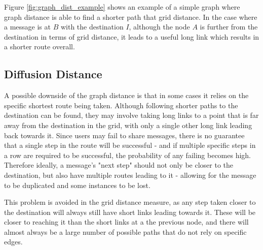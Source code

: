 \documentclass[bsc,frontabs,twoside,singlespacing,parskip,deptreport]{infthesis}     %
\begin{document}
Figure \ref{fig:graph_dist_example} shows an example of a simple graph where graph distance is able to find a shorter path that grid distance. In the case where a message is at $B$ with the destination $I$, although the node $A$ is further from the destination in terms of grid distance, it leads to a useful long link which results in a shorter route overall.

\subsection{Diffusion Distance} \label{subsec:diffusion_dist}

A possible downside of the graph distance is that in some cases it relies on the specific shortest route being taken. Although following shorter paths to the destination can be found, they may involve taking long links to a point that is far away from the destination in the grid, with only a single other long link leading back towards it. Since users may fail to share messages, there is no guarantee that a single step in the route will be successful - and if multiple specific steps in a row are required to be successful, the probability of any failing becomes high. Therefore ideally, a message's "next step" should not only be closer to the destination, but also have multiple routes leading to it - allowing for the message to be duplicated and some instances to be lost.

This problem is avoided in the grid distance measure, as any step taken closer to the destination will always still have short links leading towards it. These will be closer to reaching it than the short links at a the previous node, and there will almost always be a large number of possible paths that do not rely on specific edges.
\end{document}
